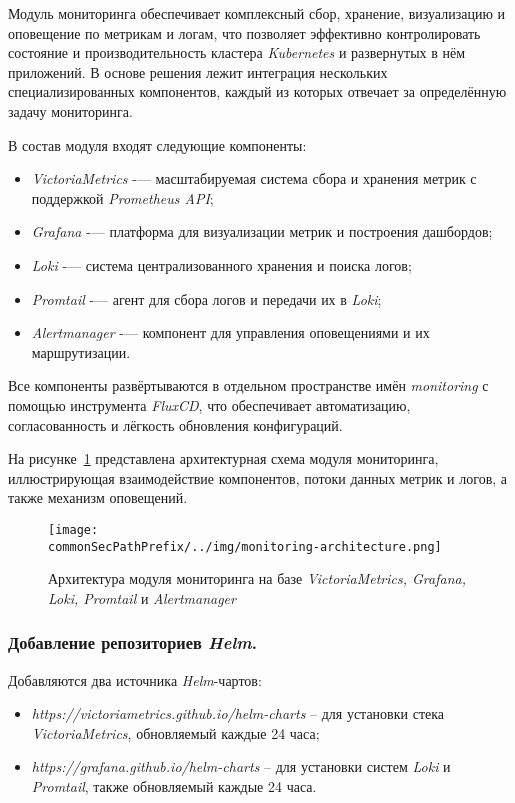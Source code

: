 Модуль мониторинга обеспечивает комплексный сбор, хранение, визуализацию и оповещение по метрикам и логам, что позволяет эффективно контролировать состояние и производительность кластера \textit{Kubernetes} и развернутых в нём приложений. В основе решения лежит интеграция нескольких специализированных компонентов, каждый из которых отвечает за определённую задачу мониторинга.

В состав модуля входят следующие компоненты:

\begin{itemize}
    \item \textit{VictoriaMetrics} -— масштабируемая система сбора и хранения метрик с поддержкой \textit{Prometheus API};
    \item \textit{Grafana} -— платформа для визуализации метрик и построения дашбордов;
    \item \textit{Loki} -— система централизованного хранения и поиска логов;
    \item \textit{Promtail} -— агент для сбора логов и передачи их в \textit{Loki};
    \item \textit{Alertmanager} -— компонент для управления оповещениями и их маршрутизации.
\end{itemize}

Все компоненты развёртываются в отдельном пространстве имён \textit{monitoring} с помощью инструмента \textit{FluxCD}, что обеспечивает автоматизацию, согласованность и лёгкость обновления конфигураций.

На рисунке~\ref{fig:monitoring-architecture} представлена архитектурная схема модуля мониторинга, иллюстрирующая взаимодействие компонентов, потоки данных метрик и логов, а также механизм оповещений.

\begin{figure}[ht]
    \centering
    \texttt{[image: \\commonSecPathPrefix/../img/monitoring-architecture.png]}
    \caption{Архитектура модуля мониторинга на базе \textit{VictoriaMetrics, Grafana, Loki, Promtail} и \textit{Alertmanager}}
    \label{fig:monitoring-architecture}
\end{figure}

\subsubsection{Добавление репозиториев \textit{Helm}.} Добавляются два источника \textit{Helm}-чартов:

\begin{itemize}
    \item \textit{https://victoriametrics.github.io/helm-charts} -- для установки стека \textit{VictoriaMetrics}, обновляемый каждые 24 часа;
    \item \textit{https://grafana.github.io/helm-charts} -- для установки систем \textit{Loki} и \textit{Promtail}, также обновляемый каждые 24 часа.
\end{itemize}

